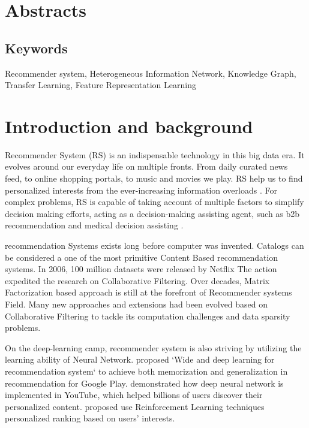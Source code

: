 \section*{Abstracts}

\subsection*{Keywords} 

Recommender system, Heterogeneous Information Network, Knowledge Graph, Transfer Learning, Feature Representation Learning


\section{Introduction and background}
Recommender System (RS) is an indispensable technology in this big data era. It evolves around our everyday life on multiple fronts. 
From daily curated news feed, to online shopping portals, to music and movies we play. RS help us to find personalized interests from the ever-increasing information overloads \citep{Lu2015}. 
For complex problems, RS is capable of taking account of multiple factors to simplify decision making efforts, acting as a decision-making assisting agent, such as b2b recommendation \citep{shambour2012trust} and medical decision assisting \citep{zhang2017idoctor}.

recommendation Systems exists long before computer was invented. Catalogs can be considered a one of the most primitive Content Based recommendation systems. In 2006, 100 million datasets were released by Netflix \citep{Bennett2007} The action expedited the research on Collaborative Filtering. Over decades, Matrix Factorization based approach is still at the forefront of Recommender systems Field. Many new approaches and extensions had been evolved based on Collaborative Filtering to tackle its computation challenges and data sparsity problems. 

On the deep-learning camp, recommender system is also striving by utilizing the learning ability of Neural Network. \citet{Cheng2016} proposed `Wide and deep learning for recommendation system` to achieve both memorization and generalization in recommendation for Google Play. \citet{Covington2016} demonstrated how deep neural network is implemented in YouTube, which helped billions of users discover their personalized content. \citet{Karatzoglou2013} proposed use Reinforcement Learning techniques personalized ranking based on users’ interests.  

